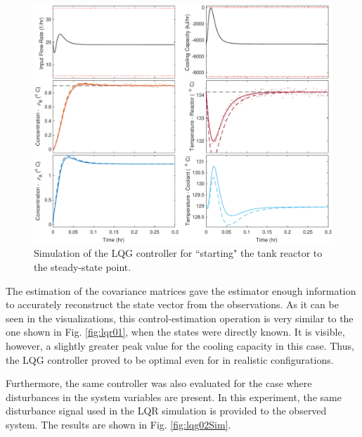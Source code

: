 \documentclass[a4paper,11pt]{book}
\numberwithin{figure}{chapter}
\numberwithin{equation}{chapter}
\numberwithin{table}{chapter}
\theoremstyle{definition}
\begin{document}
\begin{figure}[ht] \centering
	\includegraphics[width=\textwidth]{chapter7/lqg01}
	\caption{Simulation of the LQG controller for ``starting" the tank reactor to the steady-state point.}
	\label{fig:lqg01Sim}
\end{figure}

The estimation of the covariance matrices gave the estimator enough information to accurately reconstruct the state vector from the observations. As it can be seen in the visualizations, this control-estimation operation is very similar to the one shown in Fig. \ref{fig:lqr01}, when the states were directly known. It is visible, however, a slightly greater peak value for the cooling capacity in this case. Thus, the LQG controller proved to be optimal even for in realistic configurations.

Furthermore, the same controller was also evaluated for the case where disturbances in the system variables are present. In this experiment, the same disturbance signal used in the LQR simulation is provided to the observed system. The results are shown in Fig. \ref{fig:lqg02Sim}.
\end{document}
